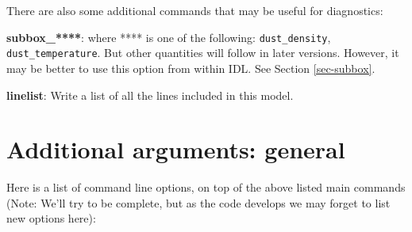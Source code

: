 \documentclass{report}
\newenvironment{options}%
  {\begin{list}{}{%
    \setlength{\topsep}{1em}%
    \setlength{\parskip}{0em}%
    \setlength{\parsep}{0em}%
    \setlength{\itemsep}{1em}%
    \setlength{\rightmargin}{0em}%
    \setlength{\leftmargin}{9em}%
    \setlength{\labelsep}{1em}%
    \setlength{\labelwidth}{6em}%
    \setlength{\itemindent}{0em}}\normalfont}%
  {\end{list}}
\begin{document}
There are also some additional commands that may be useful for diagnostics:
\begin{options}
\item[{\bf subbox\_****}:\hfill] where **** is one of the following:
  {\small\tt dust\_density}, {\small\tt dust\_temperature}. But other
  quantities will follow in later versions.  However, it may be better to
  use this option from within IDL. See Section \ref{sec-subbox}.
\item[{\bf linelist}:\hfill] Write a list of all the lines included in
  this model.
\end{options}

\section{Additional arguments: general}
Here is a list of command line options, on top of the above listed main
commands (Note: We'll try to be complete, but as the code develops we may
forget to list new options here):
\end{document}
